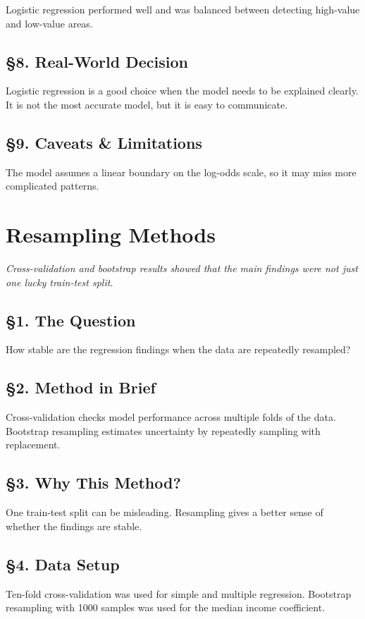 \documentclass[12pt]{report}
\begin{document}
Logistic regression performed well and was balanced between detecting high-value and low-value areas.

\section*{\S8. Real-World Decision}
Logistic regression is a good choice when the model needs to be explained clearly. It is not the most accurate model, but it is easy to communicate.

\section*{\S9. Caveats \& Limitations}
The model assumes a linear boundary on the log-odds scale, so it may miss more complicated patterns.

\newpage

\chapter{Resampling Methods}

\begin{center}
\textit{Cross-validation and bootstrap results showed that the main findings were not just one lucky train-test split.}
\end{center}

\section*{\S1. The Question}
How stable are the regression findings when the data are repeatedly resampled?

\section*{\S2. Method in Brief}
Cross-validation checks model performance across multiple folds of the data. Bootstrap resampling estimates uncertainty by repeatedly sampling with replacement.

\section*{\S3. Why This Method?}
One train-test split can be misleading. Resampling gives a better sense of whether the findings are stable.

\section*{\S4. Data Setup}
Ten-fold cross-validation was used for simple and multiple regression. Bootstrap resampling with 1000 samples was used for the median income coefficient.
\end{document}
